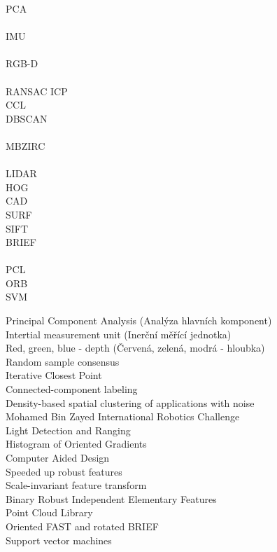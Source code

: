 \begin{symb}
    PCA \\ \\
    IMU \\ \\
    RGB-D \\ \\
    RANSAC \newline
    ICP \\
    CCL \\
    DBSCAN \\ \\
    MBZIRC \\ \\
    LIDAR \\
    HOG \\
    CAD \\
    SURF \\
    SIFT \\
    BRIEF \\ \\
    PCL \\ 
    ORB \\
    SVM

    \newpage \noindent
    Principal Component Analysis (Analýza hlavních komponent) \\
    Intertial measurement unit (Inerční měřící jednotka)\\
    Red, green, blue - depth  (Červená, zelená, modrá - hloubka)\\
    Random sample consensus \\
    Iterative Closest Point \\
    Connected-component labeling \\
    Density-based spatial clustering of applications with noise \\ 
    Mohamed Bin Zayed International Robotics Challenge \\
    Light Detection and Ranging \\
    Histogram of Oriented Gradients \\
    Computer Aided Design \\
    Speeded up robust features \\
    Scale-invariant feature transform \\
    Binary Robust Independent Elementary Features \\
    Point Cloud Library \\
    Oriented FAST and rotated BRIEF \\
    Support vector machines
\end{symb}

